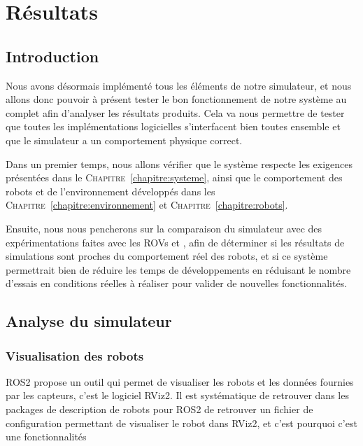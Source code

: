 \chapter{Résultats}
\label{chapter:resultats}
	
	\section{Introduction}

		Nous avons désormais implémenté tous les éléments de notre simulateur, et nous allons donc pouvoir à présent tester le bon fonctionnement de notre système au complet afin d'analyser les résultats produits. Cela va nous permettre de tester que toutes les implémentations logicielles s'interfacent bien toutes ensemble et que le simulateur a un comportement physique correct.
		
		Dans un premier temps, nous allons vérifier que le système respecte les exigences présentées dans le \textsc{Chapitre}~\ref{chapitre:systeme}, ainsi que le comportement des robots et de l'environnement développés dans les \textsc{Chapitre}~\ref{chapitre:environnement} et \textsc{Chapitre}~\ref{chapitre:robots}.

		Ensuite, nous nous pencherons sur la comparaison du simulateur avec des expérimentations faites avec les \gls{ROV}s \argos{} et \atoll{}, afin de déterminer si les résultats de simulations sont proches du comportement réel des robots, et si ce système permettrait bien de réduire les temps de développements en réduisant le nombre d'essais en conditions réelles à réaliser pour valider de nouvelles fonctionnalités.

	\section{Analyse du simulateur}

		\subsection{Visualisation des robots}

			\gls{ROS2} propose un outil qui permet de visualiser les robots et les données fournies par les capteurs, c'est le logiciel \gls{RViz2}. Il est systématique de retrouver dans les packages de description de robots pour \gls{ROS2} de retrouver un fichier de configuration permettant de visualiser le robot dans \gls{RViz2}, et c'est pourquoi c'est une fonctionnalités

